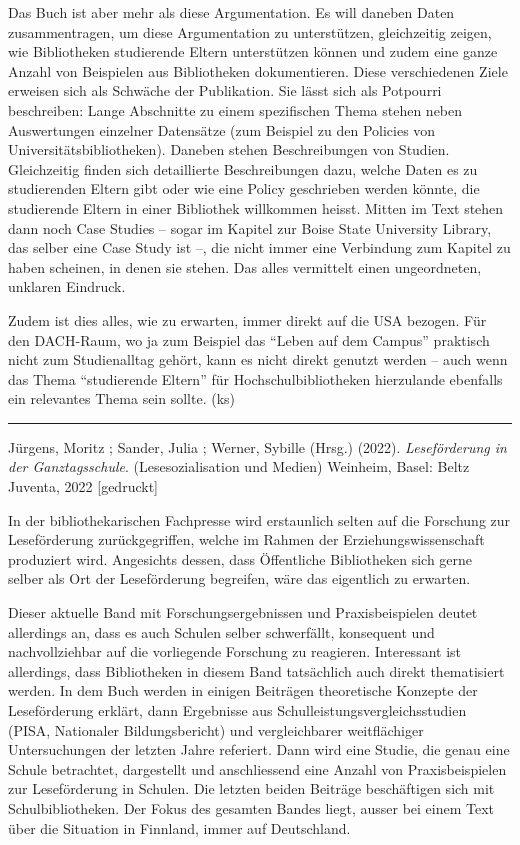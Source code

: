 \documentclass[a4paper,
fontsize=11pt,
oneside,
numbers=noperiodatend,
parskip=half-,
bibliography=totoc,
final
]{scrartcl}
\begin{document}
Das Buch ist aber mehr als diese Argumentation. Es will daneben Daten
zusammentragen, um diese Argumentation zu unterstützen, gleichzeitig
zeigen, wie Bibliotheken studierende Eltern unterstützen können und
zudem eine ganze Anzahl von Beispielen aus Bibliotheken dokumentieren.
Diese verschiedenen Ziele erweisen sich als Schwäche der Publikation.
Sie lässt sich als Potpourri beschreiben: Lange Abschnitte zu einem
spezifischen Thema stehen neben Auswertungen einzelner Datensätze (zum
Beispiel zu den Policies von Universitätsbibliotheken). Daneben stehen
Beschreibungen von Studien. Gleichzeitig finden sich detaillierte
Beschreibungen dazu, welche Daten es zu studierenden Eltern gibt oder
wie eine Policy geschrieben werden könnte, die studierende Eltern in
einer Bibliothek willkommen heisst. Mitten im Text stehen dann noch Case
Studies -- sogar im Kapitel zur Boise State University Library, das
selber eine Case Study ist --, die nicht immer eine Verbindung zum
Kapitel zu haben scheinen, in denen sie stehen. Das alles vermittelt
einen ungeordneten, unklaren Eindruck.

Zudem ist dies alles, wie zu erwarten, immer direkt auf die USA bezogen.
Für den DACH-Raum, wo ja zum Beispiel das \enquote{Leben auf dem Campus}
praktisch nicht zum Studienalltag gehört, kann es nicht direkt genutzt
werden -- auch wenn das Thema \enquote{studierende Eltern} für
Hochschulbibliotheken hierzulande ebenfalls ein relevantes Thema sein
sollte. (ks)

\begin{center}\rule{0.5\linewidth}{0.5pt}\end{center}

Jürgens, Moritz ; Sander, Julia ; Werner, Sybille (Hrsg.) (2022).
\emph{Leseförderung in der Ganztagsschule}. (Lesesozialisation und
Medien) Weinheim, Basel: Beltz Juventa, 2022 {[}gedruckt{]}

In der bibliothekarischen Fachpresse wird erstaunlich selten auf die
Forschung zur Leseförderung zurückgegriffen, welche im Rahmen der
Erziehungswissenschaft produziert wird. Angesichts dessen, dass
Öffentliche Bibliotheken sich gerne selber als Ort der Leseförderung
begreifen, wäre das eigentlich zu erwarten.

Dieser aktuelle Band mit Forschungsergebnissen und Praxisbeispielen
deutet allerdings an, dass es auch Schulen selber schwerfällt,
konsequent und nachvollziehbar auf die vorliegende Forschung zu
reagieren. Interessant ist allerdings, dass Bibliotheken in diesem Band
tatsächlich auch direkt thematisiert werden. In dem Buch werden in
einigen Beiträgen theoretische Konzepte der Leseförderung erklärt, dann
Ergebnisse aus Schulleistungsvergleichsstudien (PISA, Nationaler
Bildungsbericht) und vergleichbarer weitflächiger Untersuchungen der
letzten Jahre referiert. Dann wird eine Studie, die genau eine Schule
betrachtet, dargestellt und anschliessend eine Anzahl von
Praxisbeispielen zur Leseförderung in Schulen. Die letzten beiden
Beiträge beschäftigen sich mit Schulbibliotheken. Der Fokus des gesamten
Bandes liegt, ausser bei einem Text über die Situation in Finnland,
immer auf Deutschland.
\end{document}

